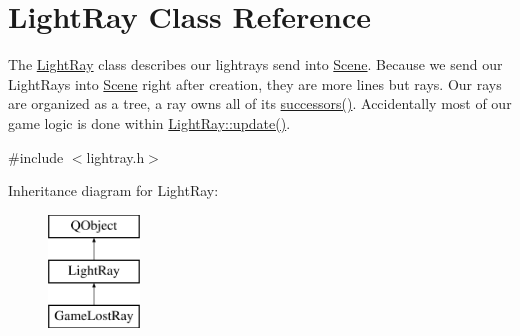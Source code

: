 \hypertarget{class_light_ray}{}\section{Light\+Ray Class Reference}
\label{class_light_ray}


The \hyperlink{class_light_ray}{Light\+Ray} class describes our lightrays send into \hyperlink{class_scene}{Scene}.  Because we send our Light\+Rays into \hyperlink{class_scene}{Scene} right after creation, they are more lines but rays. Our rays are organized as a tree, a ray owns all of its \hyperlink{class_light_ray_a6673a77eb8fcd32dcfde26a1b112d303}{successors()}. Accidentally most of our game logic is done within \hyperlink{class_light_ray_acf06a71a307433fa5b220baccf809e64}{Light\+Ray\+::update()}.  




{\ttfamily \#include $<$lightray.\+h$>$}

Inheritance diagram for Light\+Ray\+:\begin{figure}[H]
\begin{center}
\leavevmode
\includegraphics[height=3.000000cm]{class_light_ray}
\end{center}
\end{figure}
